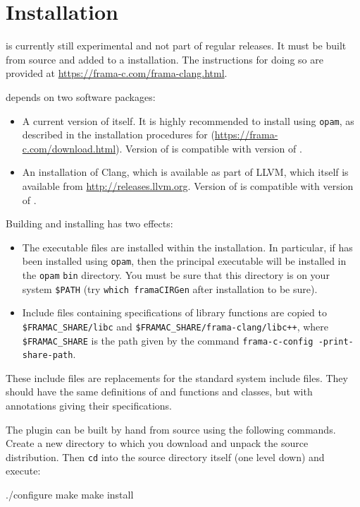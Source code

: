 

\chapter{Installation}

\fclang is currently still experimental and not part of regular \framac releases. It must be built from source and added to a \framac installation.
The instructions for doing so are provided at 
\url{https://frama-c.com/frama-clang.html}.

\fclang depends on two software packages:
\begin{itemize}
\item A current version of \framac itself. It is highly recommended to install \framac using \lstinline|opam|, as described in the installation procedures for \framac (\url{https://frama-c.com/download.html}). 
Version \fclangversion of \fclang is compatible with version \fcversion of \framac.
\item An installation of Clang, which is available as part of LLVM,
which itself is available from \url{http://releases.llvm.org}.
Version \fclangversion of \fclang is compatible with version \clangversion of \clang.
\end{itemize}

Building and installing \fclang has two effects:
\begin{itemize}
\item The \fclang executable files are installed within the \framac installation. 
In particular, if \framac has been installed using \lstinline|opam|, then the principal executable  \irg will be installed in the 
\lstinline|opam| \lstinline|bin| directory. 
You must be sure that this directory is on your system \verb|$PATH| (try \lstinline|which framaCIRGen| after installation to be sure).
\item Include files containing \acslpp specifications of \cpp library functions
are copied to \verb|$FRAMAC_SHARE/libc| and 
\verb|$FRAMAC_SHARE/frama-clang/libc++|, where \verb|$FRAMAC_SHARE| is the path
given by the command \lstinline|frama-c-config -print-share-path|.
\end{itemize}
These include files are replacements for the standard system include files.
They should have the same definitions of \C and \cpp functions and classes, but
with \acslpp annotations giving their specifications.

The plugin can be built by hand from source using the following commands. Create a new directory to which you download and unpack the source distribution. Then \lstinline|cd| into the source directory itself (one level down) and execute:
\begin{listing-nonumber}
./configure
make
make install
\end{listing-nonumber}

